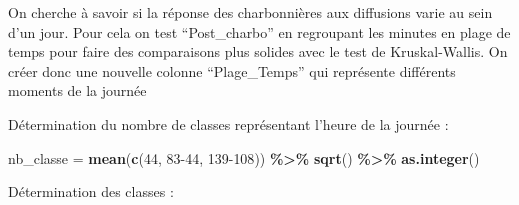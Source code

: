 \documentclass[
  french,
]{article}
\newenvironment{Shaded}{\begin{snugshade}}{\end{snugshade}}
\newcommand{\DecValTok}[1]{\textcolor[rgb]{0.00,0.00,0.81}{#1}}
\newcommand{\FunctionTok}[1]{\textcolor[rgb]{0.13,0.29,0.53}{\textbf{#1}}}
\newcommand{\NormalTok}[1]{#1}
\newcommand{\OtherTok}[1]{\textcolor[rgb]{0.56,0.35,0.01}{#1}}
\newcommand{\SpecialCharTok}[1]{\textcolor[rgb]{0.81,0.36,0.00}{\textbf{#1}}}
\newcommand{\StringTok}[1]{\textcolor[rgb]{0.31,0.60,0.02}{#1}}
\begin{document}
On cherche à savoir si la réponse des charbonnières aux diffusions varie
au sein d'un jour. Pour cela on test ``Post\_charbo'' en regroupant les
minutes en plage de temps pour faire des comparaisons plus solides avec
le test de Kruskal-Wallis. On créer donc une nouvelle colonne
``Plage\_Temps'' qui représente différents moments de la journée

Détermination du nombre de classes représentant l'heure de la journée :

\begin{Shaded}
\begin{Highlighting}[]
\NormalTok{nb\_classe }\OtherTok{=} \FunctionTok{mean}\NormalTok{(}\FunctionTok{c}\NormalTok{(}\DecValTok{44}\NormalTok{, }\DecValTok{83{-}44}\NormalTok{, }\DecValTok{139{-}108}\NormalTok{)) }\SpecialCharTok{\%\textgreater{}\%} \FunctionTok{sqrt}\NormalTok{() }\SpecialCharTok{\%\textgreater{}\%} \FunctionTok{as.integer}\NormalTok{()}
\end{Highlighting}
\end{Shaded}

Détermination des classes :

\begin{Shaded}
\end{Shaded}
\end{document}
